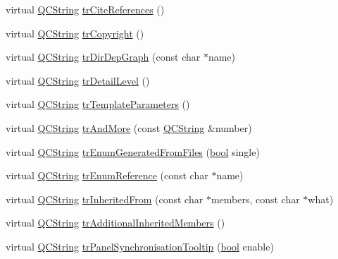 \begin{DoxyCompactItemize}
\item 
virtual \hyperlink{class_q_c_string}{Q\+C\+String} \hyperlink{class_translator_chinesetraditional_a3b2598c73b1ee59b57f88082508b86c1}{tr\+Cite\+References} ()
\item 
virtual \hyperlink{class_q_c_string}{Q\+C\+String} \hyperlink{class_translator_chinesetraditional_a29d2d31637c35174fd2aea7997837d9f}{tr\+Copyright} ()
\item 
virtual \hyperlink{class_q_c_string}{Q\+C\+String} \hyperlink{class_translator_chinesetraditional_a6a71434eafd28ebaea266715005fcf8e}{tr\+Dir\+Dep\+Graph} (const char $\ast$name)
\item 
virtual \hyperlink{class_q_c_string}{Q\+C\+String} \hyperlink{class_translator_chinesetraditional_a00053c8f20188be89234c72eda9be0b9}{tr\+Detail\+Level} ()
\item 
virtual \hyperlink{class_q_c_string}{Q\+C\+String} \hyperlink{class_translator_chinesetraditional_a2905cc66e8c20210948c8f8511241950}{tr\+Template\+Parameters} ()
\item 
virtual \hyperlink{class_q_c_string}{Q\+C\+String} \hyperlink{class_translator_chinesetraditional_a6f3733294331a8692ba66be8f52653d7}{tr\+And\+More} (const \hyperlink{class_q_c_string}{Q\+C\+String} \&number)
\item 
virtual \hyperlink{class_q_c_string}{Q\+C\+String} \hyperlink{class_translator_chinesetraditional_ad618207c34ac0cdd9b6ef4e06760be70}{tr\+Enum\+Generated\+From\+Files} (\hyperlink{qglobal_8h_a1062901a7428fdd9c7f180f5e01ea056}{bool} single)
\item 
virtual \hyperlink{class_q_c_string}{Q\+C\+String} \hyperlink{class_translator_chinesetraditional_a89cf15997aee469596da4fb791eabbe9}{tr\+Enum\+Reference} (const char $\ast$name)
\item 
virtual \hyperlink{class_q_c_string}{Q\+C\+String} \hyperlink{class_translator_chinesetraditional_ac1bf1062680895db546f1695adec0d0c}{tr\+Inherited\+From} (const char $\ast$members, const char $\ast$what)
\item 
virtual \hyperlink{class_q_c_string}{Q\+C\+String} \hyperlink{class_translator_chinesetraditional_a84f0a69aa5ba86bf01b893606a7fe9a4}{tr\+Additional\+Inherited\+Members} ()
\item 
virtual \hyperlink{class_q_c_string}{Q\+C\+String} \hyperlink{class_translator_chinesetraditional_ad842d937ba05293dcd9f47b0bff544f4}{tr\+Panel\+Synchronisation\+Tooltip} (\hyperlink{qglobal_8h_a1062901a7428fdd9c7f180f5e01ea056}{bool} enable)
\item 

\end{DoxyCompactItemize}
